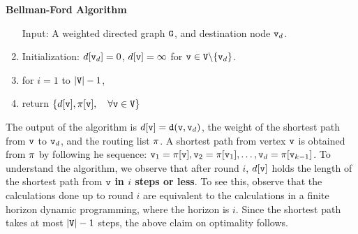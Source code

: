 \begin{algorithm_}\textbf{Bellman-Ford Algorithm}
\begin{enumerate}
\item[ Input: ] A weighted directed graph ${\tt G}$, and destination node ${\tt v}_d$.

\item Initialization:   $d[{\tt v}_d] = 0$,  $d[{\tt v}] = \infty $ for ${\tt v} \in {\tt V}\backslash \{ {\tt v}_d\} $.
                           \\

\item for  $i = 1$ to $|{\tt V}| - 1$,



	  






\item return $\{ d[{\tt v}],\pi [{\tt v}], \quad  \forall {\tt v} \in {\tt V}\} $
\end{enumerate}
\end{algorithm_}

The output of the algorithm is $d[{\tt v}] = {\tt d}({\tt v},{\tt v}_d)$, the weight of the shortest path from ${\tt v}$ to ${\tt v}_d$, and the routing list $\pi$. A shortest path from vertex ${\tt v}$ is obtained from $\pi $ by following he sequence: ${{\tt v}_1} = \pi [{\tt v}], {{\tt v}_2} = \pi [{{\tt v}_1}],  \ldots ,{\tt v}_d = \pi [{{\tt v}_{k - 1}}]$.
To understand the algorithm, we observe that after round $i$, $d[{\tt v}]$ holds the length of the shortest path from ${\tt v}$ \textbf{in $i$ steps or less}. To see this, observe that the calculations done up to round $i$ are equivalent to the calculations in a finite horizon dynamic programming, where the horizon is $i$. Since the shortest path takes at most $|{\tt V}| - 1$ steps, the above claim on optimality follows.

